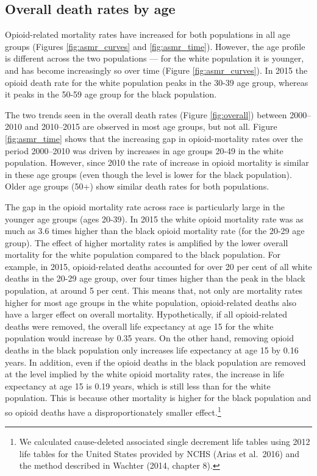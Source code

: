 \documentclass[12pt, a4paper]{article}
\begin{document}
\subsection{Overall death rates by age}

Opioid-related mortality rates have increased for both populations in all age groups (Figures \ref{fig:asmr_curves} and \ref{fig:asmr_time}). However, the age profile is different across the two populations --- for the white population it is younger, and has become increasingly so over time (Figure \ref{fig:asmr_curves}). In 2015 the opioid death rate for the white population peaks in the 30-39 age group, whereas it peaks in the 50-59 age group for the black population. 

The two trends seen in the overall death rates (Figure \ref{fig:overall}) between 2000--2010 and 2010--2015 are observed in most age groups, but not all. Figure \ref{fig:asmr_time} shows that the increasing gap in opioid-mortality rates over the period 2000--2010 was driven by increases in age groups 20-49 in the white population. However, since 2010  the rate of increase in opioid mortality is similar in these age groups (even though the level is lower for the black population). Older age groups (50+) show similar death rates for both populations. %

The gap in the opioid mortality rate across race is particularly large in the younger age groups (ages 20-39). In 2015 the white opioid mortality rate was as much as 3.6 times higher than the black opioid mortality rate (for the 20-29 age group). The effect of higher mortality rates is amplified by the lower overall mortality for the white population compared to the black population. For example, in 2015, opioid-related deaths accounted for over 20 per cent of all white deaths in the 20-29 age group, over four times higher than the peak in the black population, at around 5 per cent. This means that, not only are mortality rates higher for most age groups in the white population, opioid-related deaths also have a larger effect on overall mortality. Hypothetically, if all opioid-related deaths were removed, the overall life expectancy at age 15 for the white population would increase by 0.35 years. On the other hand, removing opioid deaths in the black population only increases life expectancy at age 15 by 0.16 years. In addition, even if the opioid deaths in the black population are removed at the level implied by the white opioid mortality rates, the increase in life expectancy at age 15 is 0.19 years, which is still less than for the white population. This is because other mortality is higher for the black population and so opioid deaths have a disproportionately smaller effect.\footnote{We calculated cause-deleted associated single decrement life tables using 2012 life tables for the United States provided by NCHS (Arias et al.\ 2016) and the method described in Wachter (2014, chapter 8).} 
\end{document}
